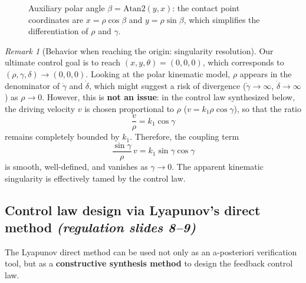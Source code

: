 \documentclass[11pt,a4paper]{article}
\theoremstyle{definition}
\theoremstyle{plain}
\theoremstyle{remark}
\newtheorem*{remark}{Remark}
\begin{document}
\begin{figure}[ht]
\centering
{}
\caption{Auxiliary polar angle $\beta=\mathrm{Atan2}(y,x)$: the contact point coordinates are $x=\rho\cos\beta$ and $y=\rho\sin\beta$, which simplifies the differentiation of $\rho$ and $\gamma$.}
\label{fig:polarbeta}
\end{figure}

\begin{remark}[Behavior when reaching the origin: singularity resolution]
Our ultimate control goal is to reach $(x,y,\theta)=(0,0,0)$, which corresponds to $(\rho,\gamma,\delta)\to(0,0,0)$.
Looking at the polar kinematic model, $\rho$ appears in the denominator of $\dot\gamma$ and $\dot\delta$, which might suggest a risk of divergence ($\dot\gamma\to\infty$, $\dot\delta\to\infty$) as $\rho\to0$.
However, this is \textbf{not an issue}: in the control law synthesized below, the driving velocity $v$ is chosen proportional to $\rho$ ($v = k_1\rho\cos\gamma$), so that the ratio
\[
\frac{v}{\rho} = k_1\cos\gamma
\]
remains completely bounded by $k_1$. Therefore, the coupling term
\[
\frac{\sin\gamma}{\rho}\,v = k_1\sin\gamma\cos\gamma
\]
is smooth, well-defined, and vanishes as $\gamma\to0$. The apparent kinematic singularity is effectively tamed by the control law.
\end{remark}

\subsection{Control law design via Lyapunov's direct method \emph{(regulation slides 8--9)}}

The Lyapunov direct method can be used not only as an a-posteriori verification tool, but as a \textbf{constructive synthesis method} to design the feedback control law.
\end{document}
